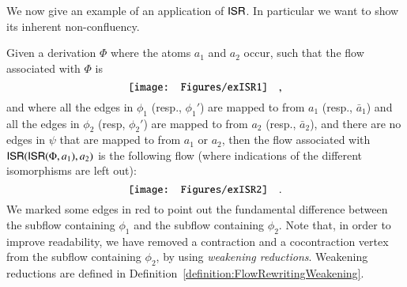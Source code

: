 We now give an example of an application of $\mathsf{ISR}$. In particular we want to show its inherent non-confluency.

\begin{example}\label{example:IsolatedSubflowRemover}
Given a derivation $\Phi$ where the atoms $a_1$ and $a_2$ occur, such that the flow associated with $\Phi$ is
\[
\vcenter{\hbox{\texttt{[image: Figures/exISR1]}}}
\quad,
\]
and where all the edges in $\phi_1$ (resp., $\phi_1'$) are mapped to from $a_1$ (resp., $\bar a_1$) and all the edges in $\phi_2$ (resp, $\phi_2'$) are mapped to from $a_2$ (resp., $\bar a_2$), and there are no edges in $\psi$ that are mapped to from $a_1$ or $a_2$, then the flow associated with $\mathsf{ISR}(\mathsf{ISR}(\Phi,a_1),a_2)$ is the following flow (where indications of the different isomorphisms are left out):
\[
\vcenter{\hbox{\texttt{[image: Figures/exISR2]}}}
\quad.
\]
We marked some edges in red to point out the fundamental difference between the subflow containing $\phi_1$ and the subflow containing $\phi_2$. Note that, in order to improve readability, we have removed a contraction and a cocontraction vertex from the subflow containing $\phi_2$, by using \emph{weakening reductions}. Weakening reductions are defined in Definition~\vref{definition:FlowRewritingWeakening}.
\end{example}
